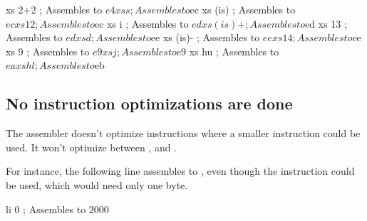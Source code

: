 \begin{code}
        xs      2+2             ; Assembles to $e4
        xs      s               ; Assembles to $ec
        xs      (is)            ; Assembles to $ec
        xs      12              ; Assembles to $ec
        xs      i               ; Assembles to $ed
        xs      (is)+           ; Assembles to $ed
        xs      13              ; Assembles to $ed
        xs      d               ; Assembles to $ee
        xs      (is)-           ; Assembles to $ee
        xs      14              ; Assembles to $ee
        xs      9               ; Assembles to $e9
        xs      j               ; Assembles to $e9
        xs      hu              ; Assembles to $ea
        xs      hl              ; Assembles to $eb
\end{code}


\subsection{No instruction optimizations are done}


The assembler doesn't optimize instructions where a smaller
instruction could be used. It won't optimize between
,  and .

For instance, the following line assembles to , even
though the  instruction could be used, which would need
only one byte.

\begin{code}
        li      0       ; Assembles to $20 $00
\end{code}
